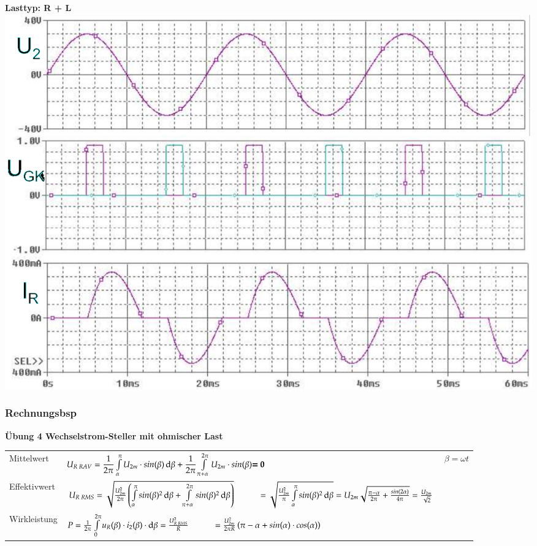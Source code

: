 \begin{minipage}{0.3\linewidth}
    \textbf{Lasttyp: R + L}\newline
    \includegraphics[width=\linewidth]{images/KLWSSteller2}
\end{minipage}


\subsubsection{Rechnungsbsp}
\textbf{Übung 4 Wechselstrom-Steller mit ohmischer Last}
\begin{longtable}{ p{}  p{}  p{} |} %
    Mittelwert&
    $ {U}_{R\; RAV} = \dfrac{1}{2\pi} \int\limits_{\alpha}^{\pi}U_{2m}\cdot sin(\beta) \mathop{}\!\mathrm{d} \beta + \dfrac{1}{2\pi} \int\limits_{\pi +\alpha}^{2\pi}U_{2m}\cdot sin(\beta) \textbf{= 0} $ &
    $ \beta = \omega t $
    \\ 
    
    Effektivwert&
    $ U_{R\; RMS}= \sqrt{\frac{U_{2m}^2}{2\pi}\left( \int\limits_{\alpha}^{\pi} sin(\beta)^2 \diff \beta + \int\limits_{\pi +\alpha}^{2\pi} sin(\beta)^2 \diff \beta \right)} \newline
    \hspace*{1cm} =\sqrt{\frac{U_{2m}^2}{\pi}\int\limits_{\alpha}^{\pi} sin(\beta)^2 \diff\beta}
    = U_{2m}\sqrt{\frac{\pi - \alpha}{2 \pi}+ \frac{sin(2\alpha)}{4\pi}} = \frac{U_{2m}}{\sqrt{2}} $ &
    \\
    
    Wirkleistung&
    $ P = \frac{1}{2\pi}\int\limits_{0}^{2\pi} u_{R}(\beta)\cdot i_2(\beta)\cdot \diff \beta = \frac{U_{R\;RMS}^2}{R} \newline
     \hspace*{1cm} = \frac{U_{2m}^2}{2\pi R}\left(\pi - \alpha + sin(\alpha) \cdot cos(\alpha)\right)$& 
    \\
    
\end{longtable}

%    
\clearpage